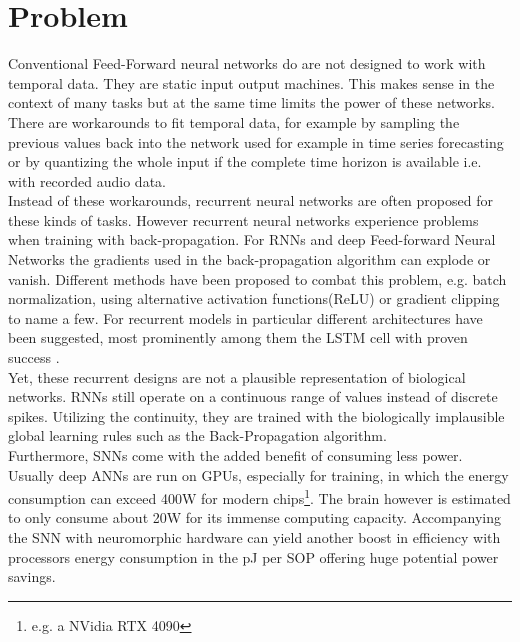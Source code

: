 \section{Problem}
Conventional Feed-Forward neural networks do are not designed to work with temporal data. They are static input output machines. This makes sense in the context of many tasks but at the same time limits the power of these networks. There are workarounds to fit temporal data, for example by sampling the previous values back into the network used for example in time series forecasting \cite{tang_feedforward_1993,yang_cascade_2022,uncini_audio_2003} or by quantizing the whole input if the complete time horizon is available i.e. with recorded audio data.\\
Instead of these workarounds, recurrent neural networks are often proposed for these kinds of tasks. However recurrent neural networks experience problems when training with back-propagation\cite{bengio_learning_1994}. For \acp{RNN} and deep Feed-forward Neural Networks the gradients used in the back-propagation algorithm can explode or vanish. Different methods have been proposed to combat this problem, e.g. batch normalization\cite{ioffe_batch_2015}, using alternative activation functions(ReLU)\cite{nair_rectified_2010} or gradient clipping\cite{pascanu_difficulty_2013} to name a few. For recurrent models in particular different architectures have been suggested, most prominently among them the \ac{LSTM} cell \cite{hochreiter_long_1997} with proven success \cite{mayer_system_2006, sak_long_2014, li_constructing_2015}.\\
Yet, these recurrent designs are not a plausible representation of biological networks.
\acp{RNN} still operate on a continuous range of values instead of discrete spikes. Utilizing the continuity, they are trained with the biologically implausible global learning rules such as the Back-Propagation algorithm.\\
Furthermore, \acp{SNN} come with the added benefit of consuming less power. Usually deep \acp{ANN} are run on \acp{GPU}, especially for training, in which the energy consumption can exceed 400W for modern chips\footnote{e.g. a NVidia RTX 4090}. The brain however is estimated to only consume about
20W \cite{clarke_circulation_1999} for its immense computing capacity. Accompanying the \ac{SNN} with neuromorphic hardware can yield another boost in efficiency with processors energy consumption in the pJ per \ac{SOP}\cite{indiveri_importance_2019} offering huge potential power savings.



